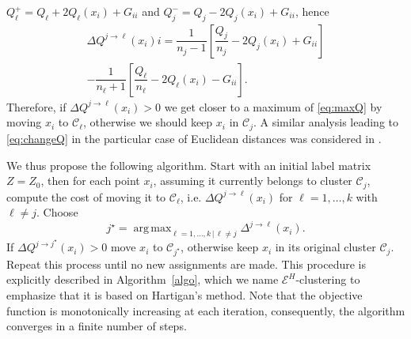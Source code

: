 \documentclass{article}
\DeclareMathOperator*{\argmax}{arg\,max}
\newcommand\C{{\mathcal{C}}}
\begin{document}
$Q_\ell^{+} = Q_\ell + 2 Q_\ell(x_i) + G_{ii}$ and
$Q_j^{-} = Q_j - 2 Q_j(x_i) + G_{ii}$, hence
\begin{multline}
\label{eq:changeQ}
\Delta Q^{j \to \ell}(x_i)  i = 
\dfrac{1}{n_j - 1} \left[ \dfrac{Q_j}{n_j} - 2 Q_j(x_i) + G_{ii} \right] \\
- \dfrac{1}{n_\ell + 1}\left[ \dfrac{Q_\ell}{n_\ell} - 2 Q_\ell(x_i) 
- G_{ii} \right].
\end{multline}
Therefore, if $\Delta Q^{j\to \ell}(x_i) > 0$ we get closer to a 
maximum of \eqref{eq:maxQ} by
moving $x_i$ to $\C_\ell$, otherwise we should keep $x_i$ in $\C_j$. 
A similar analysis leading to \eqref{eq:changeQ} in the particular
case of Euclidean distances was considered in \citet{Kgroups}.

We thus propose the following algorithm.
Start with an initial label matrix $Z=Z_0$, 
then for each point $x_i$, assuming it currently belongs to cluster
$\C_j$, compute the cost of moving it to $\C_\ell$, i.e.
$\Delta Q^{j\to \ell}(x_i)$ for 
$\ell=1,\dots,k$ with $\ell \ne j$. Choose
\begin{equation}
j^\star = \argmax_{\ell=1,\dotsc,k \, | \, \ell\ne j} 
\Delta^{j \to \ell}(x_i).
\end{equation}
If $\Delta Q^{j \to j^\star}(x_i) > 0$ move $x_i$ to $\C_{j^\star}$, 
otherwise keep $x_i$ in its original cluster $\C_j$. 
Repeat this process until no new assignments are made.
This procedure is explicitly described in Algorithm~\ref{algo}, 
which we name $\mathcal{E}^H$-clustering to emphasize that it is based on
Hartigan's method.
Note that the objective function is
monotonically increasing at each iteration, consequently, the algorithm
converges in a finite number of steps.
\end{document}
